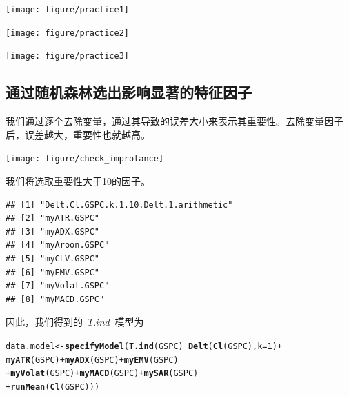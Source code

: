 \documentclass{article}\usepackage[]{graphicx}\usepackage[]{color}
\makeatletter
\newcommand{\hlnum}[1]{\textcolor[rgb]{0.686,0.059,0.569}{#1}}%
\newcommand{\hlopt}[1]{\textcolor[rgb]{0,0,0}{#1}}%
\newcommand{\hlstd}[1]{\textcolor[rgb]{0.345,0.345,0.345}{#1}}%
\newcommand{\hlkwb}[1]{\textcolor[rgb]{0.69,0.353,0.396}{#1}}%
\newcommand{\hlkwc}[1]{\textcolor[rgb]{0.333,0.667,0.333}{#1}}%
\newcommand{\hlkwd}[1]{\textcolor[rgb]{0.737,0.353,0.396}{\textbf{#1}}}%
\newenvironment{kframe}{%
 \def\at@end@of@kframe{}%
 \ifinner\ifhmode%
  \def\at@end@of@kframe{\end{minipage}}%
  \begin{minipage}{\columnwidth}%
 \fi\fi%
 \def\FrameCommand##1{\hskip\@totalleftmargin \hskip-\fboxsep
 \colorbox{shadecolor}{##1}\hskip-\fboxsep
     \hskip-\linewidth \hskip-\@totalleftmargin \hskip\columnwidth}%
 \MakeFramed {\advance\hsize-\width
   \@totalleftmargin\z@ \linewidth\hsize
   \@setminipage}}%
 {\par\unskip\endMakeFramed%
 \at@end@of@kframe}
\newenvironment{knitrout}{}{} %
\makeatother
\begin{document}
\begin{CJK*}{UTF8}{gkai}
\begin{knitrout}
{\centering \texttt{[image: figure/practice1]} 

}




{\centering \texttt{[image: figure/practice2]} 

}




{\centering \texttt{[image: figure/practice3]} 

}



\end{knitrout}

\subsection{通过随机森林选出影响显著的特征因子}



我们通过逐个去除变量，通过其导致的误差大小来表示其重要性。去除变量因子后，误差越大，重要性也就越高。
\begin{knitrout}
\color{fgcolor}

{\centering \texttt{[image: figure/check\_improtance]} 

}



\end{knitrout}

我们将选取重要性大于10的因子。
\begin{knitrout}
\color{fgcolor}\begin{kframe}
\begin{verbatim}
## [1] "Delt.Cl.GSPC.k.1.10.Delt.1.arithmetic"
## [2] "myATR.GSPC"                           
## [3] "myADX.GSPC"                           
## [4] "myAroon.GSPC"                         
## [5] "myCLV.GSPC"                           
## [6] "myEMV.GSPC"                           
## [7] "myVolat.GSPC"                         
## [8] "myMACD.GSPC"
\end{verbatim}
\end{kframe}
\end{knitrout}
因此，我们得到的~$T.ind$~模型为
\begin{knitrout}
\color{fgcolor}\begin{kframe}
\begin{alltt}
\hlstd{data.model} \hlkwb{<-} \hlkwd{specifyModel}\hlstd{(}\hlkwd{T.ind}\hlstd{(GSPC)} \hlopt{~} \hlkwd{Delt}\hlstd{(}\hlkwd{Cl}\hlstd{(GSPC),} \hlkwc{k} \hlstd{=} \hlnum{1}\hlstd{)} \hlopt{+}
                             \hlkwd{myATR}\hlstd{(GSPC)} \hlopt{+} \hlkwd{myADX}\hlstd{(GSPC)} \hlopt{+} \hlkwd{myEMV}\hlstd{(GSPC)}
                           \hlopt{+} \hlkwd{myVolat}\hlstd{(GSPC)} \hlopt{+} \hlkwd{myMACD}\hlstd{(GSPC)} \hlopt{+} \hlkwd{mySAR}\hlstd{(GSPC)}
                           \hlopt{+} \hlkwd{runMean}\hlstd{(}\hlkwd{Cl}\hlstd{(GSPC)))}
\end{alltt}
\end{kframe}
\end{knitrout}




\end{CJK*}
\end{document}
